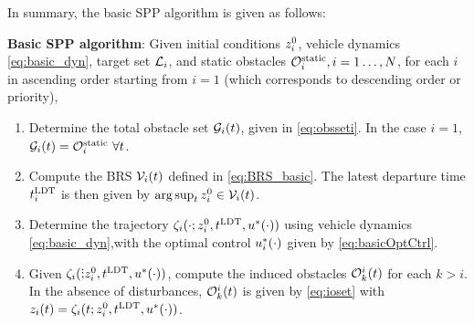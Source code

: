 In summary, the basic SPP algorithm is given as follows:

\begin{alg}
\label{alg:basic}
\textbf{Basic SPP algorithm}: Given initial conditions $z_i^0$, vehicle dynamics \eqref{eq:basic_dyn}, target set $\mathcal{L}_i$, and static obstacles $\mathcal{O}^\text{static}_i, i = 1\ldots, N$, for each $i$ in ascending order starting from $i=1$ (which corresponds to descending order or priority),
\begin{enumerate}
\item Determine the total obstacle set $\mathcal{G}_i(t)$, given in \eqref{eq:obsseti}. In the case $i=1$, $\mathcal{G}_i(t) = \mathcal{O}^\text{static}_i ~ \forall t$.
\item Compute the BRS $\mathcal{V}_i(t)$ defined in \eqref{eq:BRS_basic}. The latest departure time $t^\text{LDT}_i$ is then given by $\arg \sup_t z^0_i \in \mathcal{V}_i(t)$.
\item Determine the trajectory $\zeta_i(\cdot; z_i^0, t^\text{LDT}, u^*(\cdot))$ using vehicle dynamics \eqref{eq:basic_dyn},with the optimal control  $u_i^*(\cdot)$ given by \eqref{eq:basicOptCtrl}.
\item Given $\zeta_i(\dot; z_i^0, t^\text{LDT}, u^*(\cdot))$, compute the induced obstacles $\mathcal{O}_k^i(t)$ for each $k>i$. In the absence of disturbances, $\mathcal{O}_k^i(t)$ is given by \eqref{eq:ioset} with $z_i(t) = \zeta_i(t; z_i^0, t^\text{LDT}, u^*(\cdot))$.
\end{enumerate}
\end{alg}
